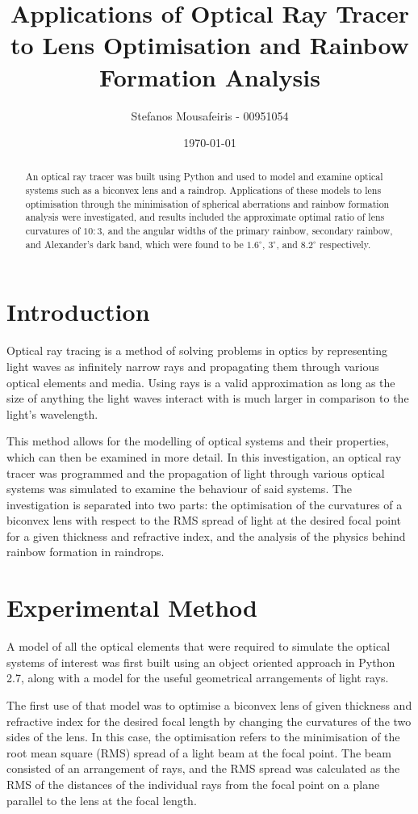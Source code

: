 \documentclass{article}
\title{Applications of Optical Ray Tracer to Lens Optimisation and Rainbow Formation Analysis}
\author{ Stefanos Mousafeiris - 00951054 }
\date{\today}
\begin{document}
\maketitle


\begin{abstract}
An optical ray tracer was built using Python and used to model and examine optical systems such as a biconvex lens and a raindrop. Applications of these models to lens optimisation through the minimisation of spherical aberrations and rainbow formation analysis were investigated, and results included the approximate optimal ratio of lens curvatures of $10:3$, and the angular widths of the primary rainbow, secondary rainbow, and Alexander's dark band, which were found to be $1.6^{\circ}$, $3^{\circ}$, and $8.2^{\circ}$ respectively.
\end{abstract}


\section{Introduction}
Optical ray tracing is a method of solving problems in optics by representing light waves as infinitely narrow rays and propagating them through various optical elements and media. Using rays is a valid approximation as long as the size of anything the light waves interact with is much larger in comparison to the light's wavelength.

This method allows for the modelling of optical systems and their properties, which can then be examined in more detail. In this investigation, an optical ray tracer was programmed and the propagation of light through various optical systems was simulated to examine the behaviour of said systems. The investigation is separated into two parts: the optimisation of the curvatures of a biconvex lens with respect to the RMS spread of light at the desired focal point for a given thickness and refractive index, and the analysis of the physics behind rainbow formation in raindrops.

\section{Experimental Method}
A model of all the optical elements that were required to simulate the optical systems of interest was first built using an object oriented approach in Python 2.7, along with a model for the useful geometrical arrangements of light rays. 

The first use of that model was to optimise a biconvex lens of given thickness and refractive index for the desired focal length by changing the curvatures of the two sides of the lens. In this case, the optimisation refers to the minimisation of the root mean square (RMS) spread of a light beam at the focal point. The beam consisted of an arrangement of rays, and the RMS spread was calculated as the RMS of the distances of the individual rays from the focal point on a plane parallel to the lens at the focal length.
\end{document}
